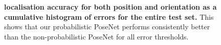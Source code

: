\begin{figure}[t]
\begin{center}
\end{center}
   \caption[Localisation accuracy histograms]{\textbf{localisation accuracy for both position and orientation as a cumulative histogram of errors for the entire test set.} This shows that our probabilistic PoseNet performs consistently better than the non-probabilistic PoseNet for all error thresholds.}
\label{fig:hist}
\end{figure}

